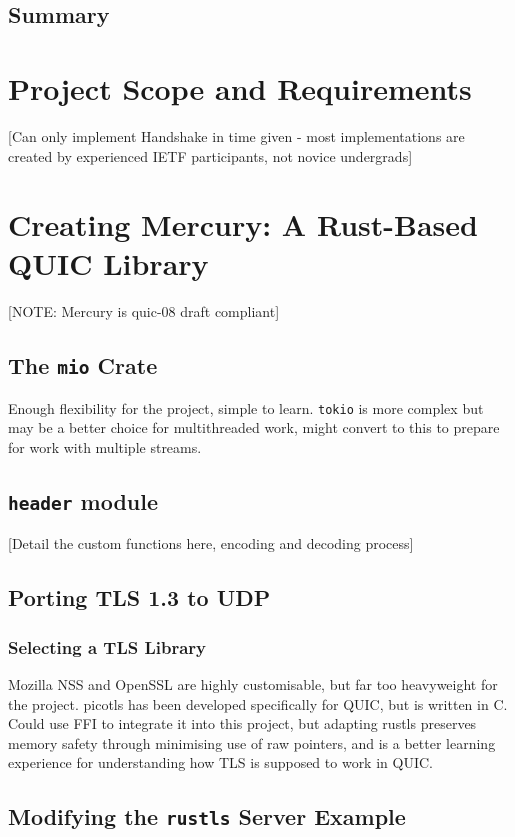 \documentclass{l4proj}
\begin{document}
\section{Summary}


\pagebreak


\chapter{Project Scope and Requirements}
[Can only implement Handshake in time given - most implementations are created by experienced IETF participants, not novice undergrads]


\pagebreak


\chapter{Creating Mercury: A Rust-Based QUIC Library}
[NOTE: Mercury is quic-08 draft compliant]

\section{The \texttt{mio} Crate}
Enough flexibility for the project, simple to learn. \texttt{tokio} is more complex but may be a better choice for multithreaded work, might convert to this to prepare for work with multiple streams. 

\section{\texttt{header} module}
[Detail the custom functions here, encoding and decoding process]

\section{Porting TLS 1.3 to UDP}
\subsection{Selecting a TLS Library}
Mozilla NSS and OpenSSL are highly customisable, but far too heavyweight for the project. picotls has been developed specifically for QUIC, but is written in C. Could use FFI to integrate it into this project, but adapting rustls preserves memory safety through minimising use of raw pointers, and is a better learning experience for understanding how TLS is supposed to work in QUIC.

\section{Modifying the \texttt{rustls} Server Example}
\end{document}
